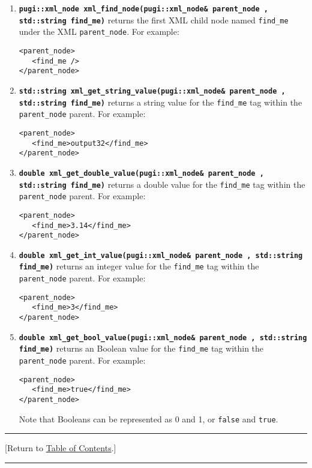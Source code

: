 \documentclass[12pt]{article}
\renewcommand{\v}{\verb}
\newcommand{\smallcode}[1]{\textbf{\texttt{#1}}}
\newcommand{\TOClink}{\begin{center}\hrule\vskip-10pt\phantom{.}\hfill[Return to \hyperlink{TOC}{Table of Contents}.]\hfill\phantom{.}\vskip3pt\hrule\end{center}}
\begin{document}
\begin{enumerate}
\item 
\smallcode{pugi::xml\_node xml\_find\_node(pugi::xml\_node\& parent\_node , std::string find\_me)} 
returns the first XML child node named \v|find_me| under the XML \v|parent_node|. For example: 

\begin{verbatim}
<parent_node>
   <find_me />
</parent_node>
\end{verbatim}

\item 
\smallcode{std::string xml\_get\_string\_value(pugi::xml\_node\& parent\_node , std::string find\_me)} returns a string value for the \v|find_me| tag within the \v|parent_node| parent. For example: 

\begin{verbatim}
<parent_node>
   <find_me>output32</find_me> 
</parent_node>
\end{verbatim}

\item 
\smallcode{double xml\_get\_double\_value(pugi::xml\_node\& parent\_node , std::string find\_me)}
returns a double value for the \v|find_me| tag within the \v|parent_node| parent. For example: 

\begin{verbatim}
<parent_node>
   <find_me>3.14</find_me> 
</parent_node>
\end{verbatim}

\item 
\smallcode{double xml\_get\_int\_value(pugi::xml\_node\& parent\_node , std::string find\_me)}
returns an integer value for the \v|find_me| tag within the \v|parent_node| parent. For example: 

\begin{verbatim}
<parent_node>
   <find_me>3</find_me> 
</parent_node>
\end{verbatim}

\item 
\smallcode{double xml\_get\_bool\_value(pugi::xml\_node\& parent\_node , std::string find\_me)}
returns an Boolean value for the \v|find_me| tag within the \v|parent_node| parent. For example: 

\begin{verbatim}
<parent_node>
   <find_me>true</find_me> 
</parent_node>
\end{verbatim}
Note that Booleans can be represented as 0 and 1, or \v|false| and \v|true|. 

\end{enumerate}
\TOClink
\end{document}
